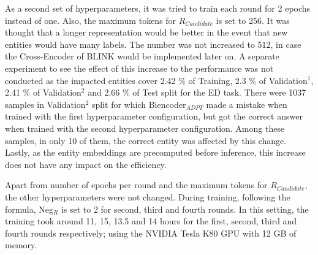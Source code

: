 \documentclass{report}
\theoremstyle{definition}
\theoremstyle{remark}
\begin{document}
As a second set of hyperparameters, it was tried to train each round for 2 epochs instead of one. Also, the maximum tokens for $R_{Candidate}$ is set to 256. It was thought that a longer representation would be better in the event that new entities would have many labels. The number was not increased to 512, in case the Cross-Encoder of BLINK \cite{scalablezeroshot} would be implemented later on. A separate experiment to see the effect of this increase to the performance was not conducted as the impacted entities cover 2.42 \% of Training, 2.3 \% of Validation$^1$, 2.41 \% of Validation$^2$ and 2.66 \% of Test split for the ED task. There were 1037 samples in Validation$^2$ split for which Biencoder$_{ADPT}$ made a mistake when trained with the first hyperparameter configuration, but got the correct answer when trained with the second hyperparameter configuration. Among these samples, in only 10 of them, the correct entity was affected by this change. Lastly, as the entity embeddings are precomputed before inference, this increase does not have any impact on the efficiency.

Apart from number of epochs per round and the maximum tokens for $R_{Candidate}$, the other hyperparameters were not changed. During training, following the formula, Neg$_R$ is set to 2 for second, third and fourth rounds. In this setting, the training took around 11, 15, 13.5 and 14 hours for the first, second, third and fourth rounds respectively; using the NVIDIA Tesla K80 GPU with 12 GB of memory.
\end{document}
